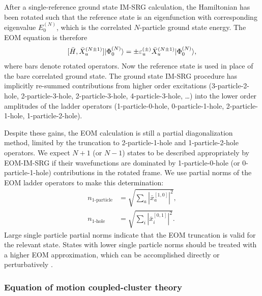 After a single-reference ground state IM-SRG calculation, the Hamiltonian has been rotated such that the reference state is an eigenfunction with corresponding eigenvalue $E^{(N)}_0$, which is the correlated $N$-particle ground state energy. The EOM equation is therefore
\begin{align} \label{eq:EOMIMSRG}
  [\bar{H},\bar{X}^{(N \pm 1)}_u] | \Phi^{(N)}_0 \rangle = \pm \varepsilon^{(\pm)}_u \bar{X}^{(N \pm 1)}_u | \Phi^{(N)}_0 \rangle,
\end{align}
where bars denote rotated operators. Now the reference state is used in place of the bare correlated ground state. The ground state IM-SRG procedure has implicitly re-summed contributions from higher order excitations (3-particle-2-hole, 2-particle-3-hole, 2-particle-3-hole, 4-particle-3-hole, \ldots) into the lower order amplitudes of the ladder operators (1-particle-0-hole, 0-particle-1-hole, 2-particle-1-hole, 1-particle-2-hole).

Despite these gains, the EOM calculation is still a partial diagonalization method, limited by the truncation to 2-particle-1-hole and 1-particle-2-hole operators. We expect $N + 1$ (or $N - 1$) states to be described appropriately by EOM-IM-SRG if their wavefunctions are dominated by 1-particle-0-hole (or 0-particle-1-hole) contributions in the rotated frame. We use partial norms of the EOM ladder operators to make this determination:
\begin{align}
  \label{eq:partial_norms_p}
  n_{\text{1-particle}} &= \sqrt{\sum_a | \bar{x}^{[1,0]}_a |^2},\\
  \label{eq:partial_norms_h}
  n_{\text{1-hole}} &= \sqrt{\sum_i | \bar{x}^{[0,1]}_i |^2}.
\end{align}
Large single particle partial norms indicate that the EOM truncation is valid for the relevant state. States with lower single particle norms should be treated with a higher EOM approximation, which can be accomplished directly or perturbatively \cite{PhysRevC.95.044304}.

\subsubsection*{Equation of motion coupled-cluster theory}

